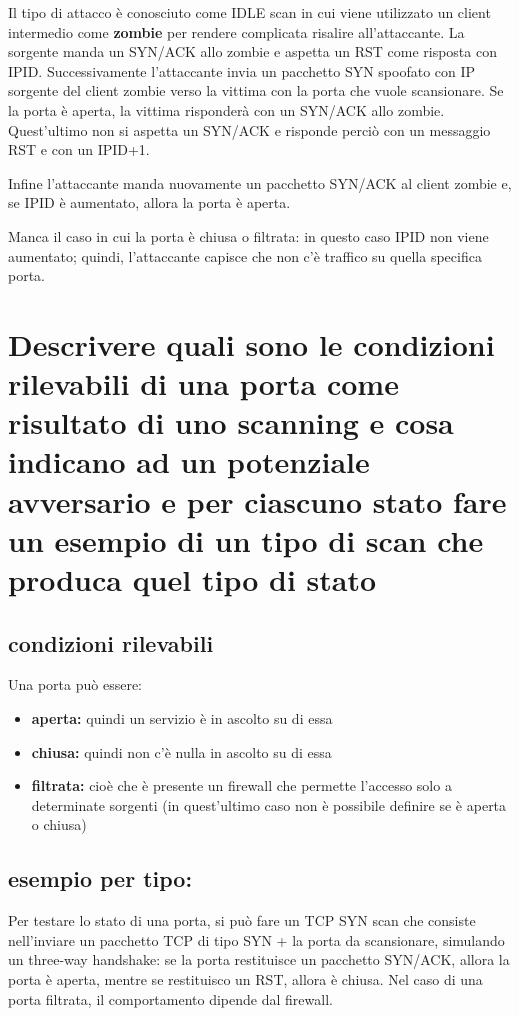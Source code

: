 \documentclass{report}
\begin{document}
\noindent Il tipo di attacco è conosciuto come IDLE scan in cui viene utilizzato 
un client intermedio come \textbf{zombie} per rendere complicata risalire all'attaccante. 
La sorgente manda un SYN/ACK allo zombie e aspetta un RST come risposta con IPID. 
Successivamente l'attaccante invia un pacchetto SYN spoofato con IP sorgente del client zombie verso 
la vittima con la porta che vuole scansionare. 
Se la porta è aperta, la vittima risponderà con un SYN/ACK allo zombie. Quest'ultimo non si aspetta un SYN/ACK e risponde 
perciò con un messaggio RST e con un IPID+1. 

\noindent Infine l'attaccante manda nuovamente un pacchetto SYN/ACK al client zombie e, se IPID è aumentato, allora la porta è aperta.

\noindent Manca il caso in cui la porta è chiusa o filtrata: in questo caso IPID non viene aumentato; quindi, l'attaccante capisce che non c'è traffico su quella specifica porta.

\section{Descrivere quali sono le condizioni rilevabili di una porta come risultato di uno scanning e cosa indicano ad un potenziale avversario e 
per ciascuno stato fare un esempio di un tipo di scan che produca quel tipo di stato}

\subsection{condizioni rilevabili}
Una porta può essere:
\begin{itemize}
    \item \textbf{aperta:} quindi un servizio è in ascolto su di essa
    \item \textbf{chiusa:} quindi non c'è nulla in ascolto su di essa 
    \item \textbf{filtrata:} cioè che è presente un firewall che permette l'accesso solo a determinate sorgenti (in quest'ultimo caso non è possibile definire se è aperta o chiusa)
\end{itemize} 

\subsection{esempio per tipo:}
Per testare lo stato di una porta, si può fare un TCP SYN scan che consiste nell'inviare un pacchetto TCP di tipo SYN + la porta da scansionare,
simulando un three-way handshake: se la porta restituisce un pacchetto SYN/ACK, 
allora la porta è aperta, mentre se restituisco un RST, allora è chiusa. Nel caso di una porta filtrata, il comportamento dipende dal firewall.
\end{document}
